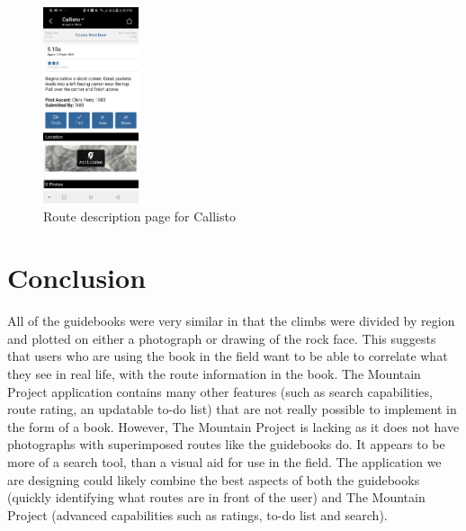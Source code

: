 \documentclass[10pt]{article}
\begin{document}
\begin{figure}[!h]
  \centering
  \includegraphics[width=0.25\textwidth]{mp_callisto.jpg}
  \caption{Route description page for Callisto}
  \label{fig:mp_callisto}
\end{figure}

\section{Conclusion}
All of the guidebooks were very similar in that the climbs were divided by region and plotted on either a photograph or drawing of the rock face. This suggests that users who are using the book in the field want to be able to correlate what they see in real life, with the route information in the book. The Mountain Project application contains many other features (such as search capabilities, route rating, an updatable to-do list) that are not really possible to implement in the form of a book. However, The Mountain Project is lacking as it does not have photographs with superimposed routes like the guidebooks do. It appears to be more of a search tool, than a visual aid for use in the field. The application we are designing could likely combine the best aspects of both the guidebooks (quickly identifying what routes are in front of the user) and The Mountain Project (advanced capabilities such as ratings, to-do list and search).

\pagebreak
\printbibliography
\end{document}
